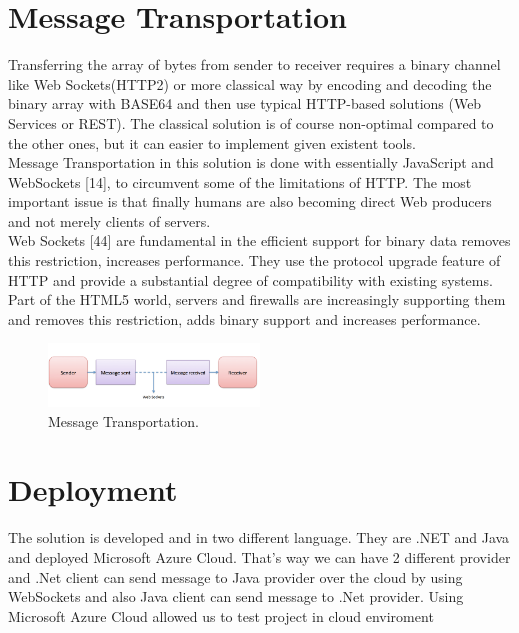 \section{Message Transportation}
\label{section:messageTransfer}

Transferring the array of bytes from sender to receiver requires a binary channel like Web Sockets(HTTP2) or
more classical way by encoding and decoding the binary array with BASE64 and then use typical HTTP-based
solutions (Web Services or REST). The classical solution is of course non-optimal compared to the other ones,
but it can easier to implement given existent tools.\\

Message Transportation in this solution is done with essentially JavaScript and WebSockets [14], to circumvent some of the limitations of HTTP.
The most important issue is that finally humans are also becoming direct Web producers and not merely clients of servers.\\

Web Sockets [44] are fundamental in the efficient support for binary data removes this restriction, increases performance.
They use the protocol upgrade feature of HTTP and
provide a substantial degree of compatibility with existing systems. Part of the HTML5 world, servers and firewalls are
increasingly supporting them and removes this restriction, adds binary support and increases performance.

\begin{figure}[!htb]
  \centering
  \includegraphics[width=0.5\textwidth]{Figures/websocket.png}
  \caption[Message Transportation.]{Message Transportation.}
  \label{fig:websocket}
\end{figure}


\section{Deployment}
\label{section:deployment}

The solution is developed and in two different language. They are .NET and Java and deployed Microsoft Azure Cloud. That's way we can
have 2 different provider and .Net client can send message to Java provider over the cloud by using WebSockets and also Java client can
send message to .Net provider. Using Microsoft Azure Cloud allowed us to test project in cloud enviroment
